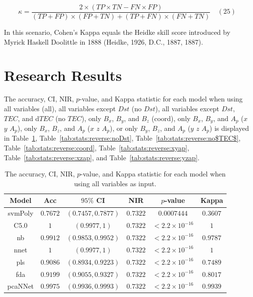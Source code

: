 \documentclass[sn-mathphys-num]{sn-jnl}%
\begin{document}
\begin{equation}
	\kappa ={\frac{2\times (TP\times TN-FN\times FP)}{(TP+FP)\times (FP+TN)+(TP+FN)\times (FN+TN)}}
	\quad\left(25\right)
\end{equation}

In this scenario, Cohen's Kappa equals the Heidke skill score introduced by Myrick Haskell Doolittle in 1888 (Heidke, 1926, D.C., 1887, 1887).

\section{Research Results}
\label{sec:Results}

The accuracy, CI, NIR, $p$-value, and Kappa statistic for each model when using all variables (all), all variables except $Dst$ (no $Dst$), all variables except $Dst$, $TEC$, and d$TEC$ (no $TEC$), only $B_{x}$, $B_{y}$, and $B_{z}$ (coord), only $B_{x}$, $B_{y}$, and $A_{p}$ ($x$ $y$ $A_{p}$), only $B_{x}$, $B_{z}$, and $A_{p}$ ($x$ $z$ $A_{p}$), or only $B_{y}$, $B_{z}$, and $A_{p}$ ($y$ $z$ $A_{p}$) is displayed in Table~\ref{tab:stats:reverse:all}, Table~\ref{tab:stats:reverse:noDst}, Table~\ref{tab:stats:reverse:no$TEC$}, Table~\ref{tab:stats:reverse:coord}, Table~\ref{tab:stats:reverse:xyap}, Table~\ref{tab:stats:reverse:xzap}, and Table~\ref{tab:stats:reverse:yzap}.

\begin{table}[!ht]
    \centering
    \caption{The accuracy, CI, NIR, $p$-value, and Kappa statistic for each model when using all variables as input.}
	\label{tab:stats:reverse:all}
	\begin{tabular}{|c|c|c|c|c|c|}
		\hline
		Model & Acc & $95\%$ CI & NIR & $p$-value & Kappa \\ \hline
		svmPoly & $0.7672$ & $(0.7457, 0.7877)$ & $0.7322$ & $0.0007444$ & $0.3607$ \\ \hline
		C5.0 & $1$ & $(0.9977, 1)$ & $0.7322$ & $< 2.2 \times {10}^{-16}$ & $1$ \\ \hline
		nb & $0.9912$ & $(0.9853, 0.9952)$ & $0.7322$ & $< 2.2 \times {10}^{-16}$ & $0.9787$ \\ \hline
		nnet & $1$ & $(0.9977, 1)$ & $0.7322$ & $< 2.2 \times {10}^{-16}$ & $1$ \\ \hline
		pls & $0.9086$ & $(0.8934, 0.9223)$ & $0.7322$ & $< 2.2 \times {10}^{-16}$ & $0.7489$ \\ \hline
		fda & $0.9199$ & $(0.9055, 0.9327)$ & $0.7322$ & $< 2.2 \times {10}^{-16}$ & $0.8017$ \\ \hline
		pcaNNet & $0.9975$ & $(0.9936, 0.9993)$ & $0.7322$ & $< 2.2 \times {10}^{-16}$ & $0.9939$ \\ \hline
	\end{tabular}
\end{table}
\end{document}
